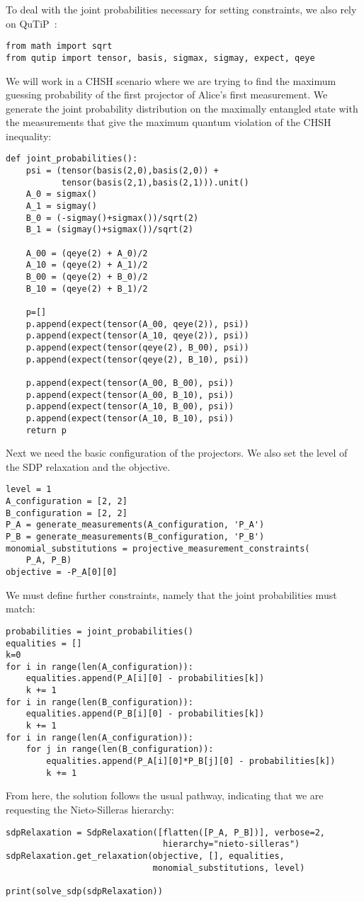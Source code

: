 \documentclass{article}
\begin{document}
To deal with the joint probabilities necessary for setting constraints, we also rely on QuTiP~\citep{johansson2013qutip}:
\begin{verbatim}
from math import sqrt
from qutip import tensor, basis, sigmax, sigmay, expect, qeye
\end{verbatim}
We will work in a CHSH scenario where we are trying to find the maximum guessing probability of the first projector of Alice's first measurement. We generate the joint probability distribution on the maximally entangled state with the measurements that give the maximum quantum violation of the CHSH inequality:
\begin{verbatim}
def joint_probabilities():
    psi = (tensor(basis(2,0),basis(2,0)) + 
           tensor(basis(2,1),basis(2,1))).unit()
    A_0 = sigmax()
    A_1 = sigmay()
    B_0 = (-sigmay()+sigmax())/sqrt(2)
    B_1 = (sigmay()+sigmax())/sqrt(2)

    A_00 = (qeye(2) + A_0)/2
    A_10 = (qeye(2) + A_1)/2
    B_00 = (qeye(2) + B_0)/2
    B_10 = (qeye(2) + B_1)/2

    p=[]
    p.append(expect(tensor(A_00, qeye(2)), psi))
    p.append(expect(tensor(A_10, qeye(2)), psi))
    p.append(expect(tensor(qeye(2), B_00), psi))
    p.append(expect(tensor(qeye(2), B_10), psi))

    p.append(expect(tensor(A_00, B_00), psi))
    p.append(expect(tensor(A_00, B_10), psi))
    p.append(expect(tensor(A_10, B_00), psi))
    p.append(expect(tensor(A_10, B_10), psi))
    return p
\end{verbatim}
Next we need the basic configuration of the projectors. We also set the level of the SDP relaxation and the objective. 
\begin{verbatim}
level = 1
A_configuration = [2, 2]
B_configuration = [2, 2]
P_A = generate_measurements(A_configuration, 'P_A')
P_B = generate_measurements(B_configuration, 'P_B')
monomial_substitutions = projective_measurement_constraints(
    P_A, P_B)
objective = -P_A[0][0]
\end{verbatim}
We must define further constraints, namely that the joint probabilities must match: 
\begin{verbatim}
probabilities = joint_probabilities()
equalities = []
k=0
for i in range(len(A_configuration)):
    equalities.append(P_A[i][0] - probabilities[k])
    k += 1
for i in range(len(B_configuration)):
    equalities.append(P_B[i][0] - probabilities[k])
    k += 1
for i in range(len(A_configuration)):
    for j in range(len(B_configuration)):
        equalities.append(P_A[i][0]*P_B[j][0] - probabilities[k])
        k += 1
\end{verbatim}
From here, the solution follows the usual pathway, indicating that we are requesting the Nieto-Silleras hierarchy:
\begin{verbatim}
sdpRelaxation = SdpRelaxation([flatten([P_A, P_B])], verbose=2,
                               hierarchy="nieto-silleras")
sdpRelaxation.get_relaxation(objective, [], equalities,
                             monomial_substitutions, level)

print(solve_sdp(sdpRelaxation))
\end{verbatim}
\end{document}
